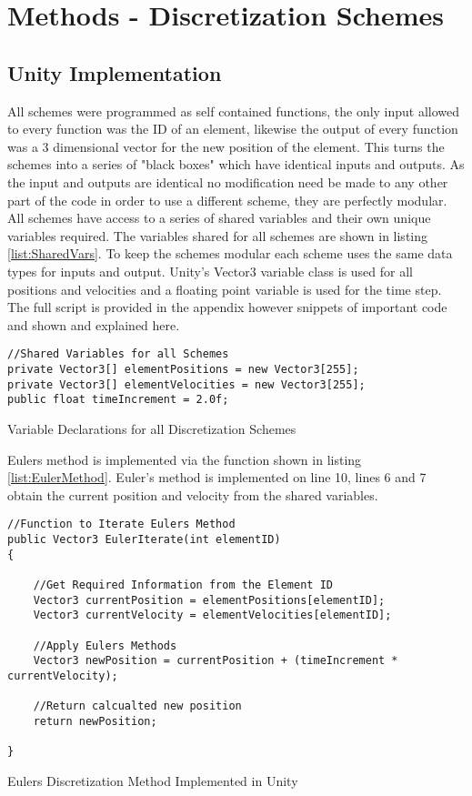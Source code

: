 \section{Methods - Discretization Schemes}
\subsection{Unity Implementation}
All schemes were programmed as self contained functions, the only input allowed to every function was the ID of an element, likewise the output of every function was a 3 dimensional vector for the new position of the element. This turns the schemes into a series of "black boxes" which have identical inputs and outputs. As the input and outputs are identical no modification need be made to any other part of the code in order to use a different scheme, they are perfectly modular. All schemes have access to a series of shared variables and their own unique variables required. The variables shared for all schemes are shown in listing \ref{list:SharedVars}. To keep the schemes modular each scheme uses the same data types for inputs and output. Unity's Vector3 variable class is used for all positions and velocities and a floating point variable is used for the time step. The full script is provided in the appendix however snippets of important code and shown and explained here.

\begin{listing}[H]
\begin{verbatim}
//Shared Variables for all Schemes
private Vector3[] elementPositions = new Vector3[255];
private Vector3[] elementVelocities = new Vector3[255];
public float timeIncrement = 2.0f;

\end{verbatim}
\caption{Variable Declarations for all Discretization Schemes}
\label{list:SharedVars}
\end{listing}

Eulers method is implemented via the function shown in listing \ref{list:EulerMethod}. Euler's method is implemented on line 10, lines 6 and 7 obtain the current position and velocity from the shared variables.

\begin{listing}[H]
\begin{verbatim}
//Function to Iterate Eulers Method
public Vector3 EulerIterate(int elementID)
{

    //Get Required Information from the Element ID
    Vector3 currentPosition = elementPositions[elementID];
    Vector3 currentVelocity = elementVelocities[elementID];

    //Apply Eulers Methods
    Vector3 newPosition = currentPosition + (timeIncrement * currentVelocity);

    //Return calcualted new position
    return newPosition;
        
}
\end{verbatim}
\caption{Eulers Discretization Method Implemented in Unity}
\label{list:EulerMethod}
\end{listing}

